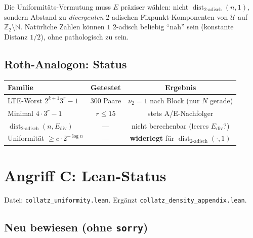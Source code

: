 \documentclass[12pt,a4paper]{article}
\newcommand{\vii}{\nu_2}
\newcommand{\N}{\mathbb{N}}
\newcommand{\Ztwo}{\mathbb{Z}_2}
\newcommand{\U}{\mathcal{U}}
\newcommand{\disttwo}{\operatorname{dist}_{2\text{-adisch}}}
\begin{document}
\begin{tcolorbox}[offen,title={Konsequenz}]
Die Uniformitäts-Vermutung muss $E$ präziser wählen: nicht
$\disttwo(n,1)$, sondern Abstand zu \emph{divergenten} 2-adischen
Fixpunkt-Komponenten von $\U$ auf $\Ztwo\setminus\N$.
Natürliche Zahlen können $1$ 2-adisch beliebig ``nah'' sein
(konstante Distanz $1/2$), ohne pathologisch zu sein.
\end{tcolorbox}

\subsection{Roth-Analogon: Status}

\begin{center}
\renewcommand{\arraystretch}{1.3}
\begin{tabular}{>{\raggedright}p{5.5cm}cc}
\toprule
\textbf{Familie} & \textbf{Getestet} & \textbf{Ergebnis} \\
\midrule
LTE-Worst $2^{k+1}3^r-1$ & $300$ Paare & $\vii=1$ nach Block (nur $N$ gerade) \\
Minimal $4\cdot 3^r-1$ & $r\leq 15$ & stets A/E-Nachfolger \\
$\disttwo(n,E_{\mathrm{div}})$ & --- & nicht berechenbar (leeres $E_{\mathrm{div}}$?) \\
Uniformität $\geq c\cdot 2^{-\log n}$ & --- & \textbf{widerlegt} für $\disttwo(\cdot,1)$ \\
\bottomrule
\end{tabular}
\end{center}

\section{Angriff C: Lean-Status}
\label{sec:lean}

Datei: \texttt{collatz\_uniformity.lean}. Ergänzt
\texttt{collatz\_density\_appendix.lean}.

\subsection{Neu bewiesen (ohne \texttt{sorry})}
\end{document}
